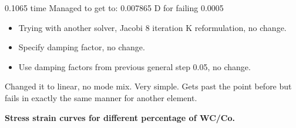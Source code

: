 \documentclass[wcco.tex]{subfiles}
\begin{document}
0.1065 time
Managed to get to: 0.007865 D for failing 0.0005

\begin{itemize}
\item Trying with another solver, Jacobi 8 iteration K reformulation, no change.
\item Specify damping factor, no change.
\item Use damping factors from previous general step 0.05, no change.
\end{itemize}

 
 
 Changed it to linear, no mode mix. Very simple. Gets past the point before but fails in exactly the same manner for another element.
 
 
\newpage

\textbf{Stress strain curves for different percentage of WC/Co.}
\end{document}

